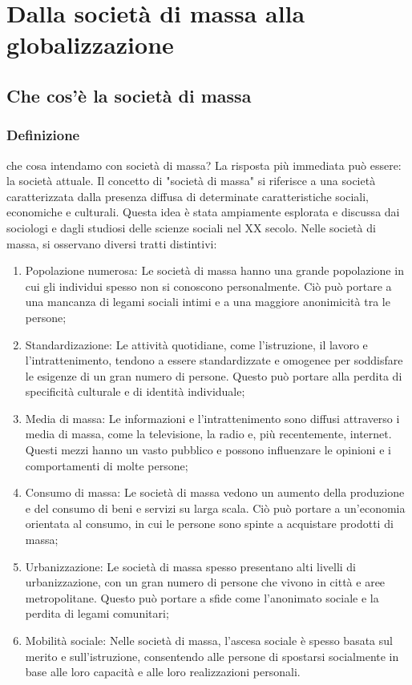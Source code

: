 \documentclass{report}
\begin{document}


\chapter{Dalla società di massa alla globalizzazione} %
\label{chap:Dalla società di massa alla globalizzazione}

\section{Che cos'è la società di massa}

\subsection{Definizione}
che cosa intendamo con società di massa? La risposta più immediata può essere: la società attuale.
Il concetto di "società di massa" si riferisce a una società caratterizzata dalla presenza diffusa di determinate caratteristiche sociali, economiche e culturali. Questa idea è stata ampiamente esplorata e discussa dai sociologi e dagli studiosi delle scienze sociali nel XX secolo.
Nelle società di massa, si osservano diversi tratti distintivi:

\begin{enumerate}
  \item Popolazione numerosa: Le società di massa hanno una grande popolazione in cui gli individui spesso non si conoscono personalmente. Ciò può portare a una mancanza di legami sociali intimi e a una maggiore anonimicità tra le persone;
  \item Standardizazione: Le attività quotidiane, come l'istruzione, il lavoro e l'intrattenimento, tendono a essere standardizzate e omogenee per soddisfare le esigenze di un gran numero di persone. Questo può portare alla perdita di specificità culturale e di identità individuale;
  \item Media di massa: Le informazioni e l'intrattenimento sono diffusi attraverso i media di massa, come la televisione, la radio e, più recentemente, internet. Questi mezzi hanno un vasto pubblico e possono influenzare le opinioni e i comportamenti di molte persone;
  \item Consumo di massa: Le società di massa vedono un aumento della produzione e del consumo di beni e servizi su larga scala. Ciò può portare a un'economia orientata al consumo, in cui le persone sono spinte a acquistare prodotti di massa;
  \item Urbanizzazione: Le società di massa spesso presentano alti livelli di urbanizzazione, con un gran numero di persone che vivono in città e aree metropolitane. Questo può portare a sfide come l'anonimato sociale e la perdita di legami comunitari;
  \item Mobilità sociale: Nelle società di massa, l'ascesa sociale è spesso basata sul merito e sull'istruzione, consentendo alle persone di spostarsi socialmente in base alle loro capacità e alle loro realizzazioni personali.
\end{enumerate}
\end{document}
